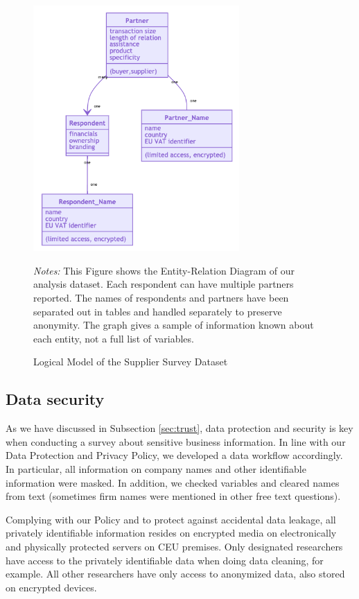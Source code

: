 \usepackage{}\documentclass[final, dvipsnames, authoryear,12pt]{elsarticle}
\begin{document}
\begin{figure}[!h]
    \caption{Logical Model of the Supplier Survey Dataset}
    \label{fig:ERD} 
    \begin{center}    
    \includegraphics[width=0.7\textwidth]{graphs/ERD.png}
     \end{center}    
        {\footnotesize \textit{Notes:} This Figure shows the Entity-Relation Diagram of our analysis dataset. Each respondent can have multiple partners reported. The names of respondents and partners have been separated out in tables and handled separately to preserve anonymity. The graph gives a sample of information known about each entity, not a full list of variables.} 
\end{figure}

\subsection{Data security} 

As we have discussed in Subsection \ref{sec:trust}, data protection and security is key when conducting a survey about sensitive business information. In line with our Data Protection and Privacy Policy, we developed a data workflow accordingly. In particular, all information on company names and other identifiable information were masked. In addition, we checked variables and cleared names from text (sometimes firm names were mentioned in other free text questions).

Complying with our Policy and to protect against accidental data leakage, all privately identifiable information resides on encrypted media on electronically and physically protected servers on CEU premises. Only designated researchers have access to the privately identifiable data when doing data cleaning, for example. All other researchers have only access to anonymized data, also stored on encrypted devices.
\end{document}
